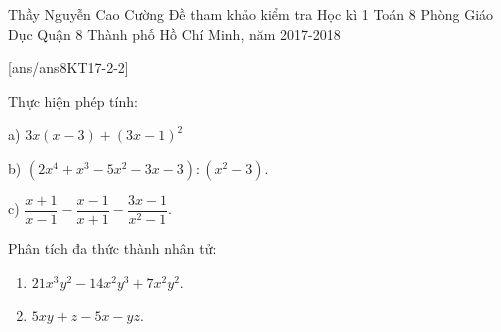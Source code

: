 \begin{name}
{Thầy  Nguyễn Cao Cường}
{Đề tham khảo kiểm tra Học kì 1 Toán 8 Phòng Giáo Dục Quận 8  Thành phố Hồ Chí Minh, năm 2017-2018}
\end{name}
\setcounter{ex}{0}
[ans/ans8KT17-2-2]
\begin{ex}%
Thực hiện phép tính:
\begin{multicols}{1}
\item [a)] $3x(x-3)+(3x-1)^2$
\item [b)] $(2x^4+x^3-5x^2-3x-3):(x^2-3)$.
\item [c)] $\dfrac{x+1}{x-1}-\dfrac{x-1}{x+1}-\dfrac{3x-1}{x^2-1}$.
\end{multicols}
\end{ex}
\begin{ex}%
Phân tích đa thức thành nhân tử:
\begin{enumerate}
\item  $21x^3y^2-14x^2y^3+7x^2y^2$.
\item  $5xy+z-5x-yz$.
\end{enumerate}
\end{ex}

